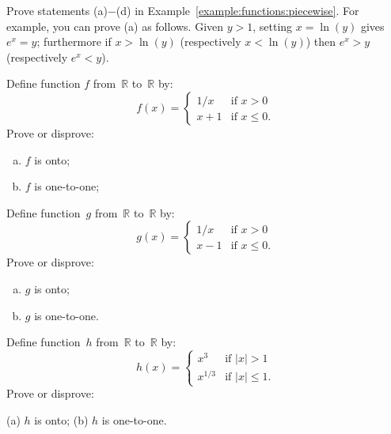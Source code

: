 \begin{exercise}{}
Prove statements (a)$-$(d) in Example~\ref{example:functions:piecewise}.  For example, you can prove (a)  as follows. Given $y>1$, setting $x = \ln(y)$ gives $e^x = y$; furthermore if $x > \ln(y)$ (respectively  $x < \ln(y)$) then $e^x > y$ (respectively $e^x < y$).
\end{exercise}



\begin{exercise}{} \label{OntoCasesExer}
 Define function $f$  from~$\mathbb{R}$ to~$\mathbb{R}$ by:
$$ f(x) = 
\begin{cases}
1/x & \mbox{if $x > 0$} \\
x + 1 & \mbox{if $x \le 0$.}
\end{cases} $$
Prove or disprove:
\begin{multicols}{2}
 \begin{enumerate}[(a)]
 \item \label{OntoCasesExer-fOnto}
 $f$ is onto;
 \item \label{OntoCasesExer-fNot11}
 $f$ is one-to-one;
\end{enumerate}
\end{multicols}
\end{exercise}

\begin{exercise}{} \label{OntoCasesExer2}
 Define function~$g$ from~$\mathbb{R}$ to~$\mathbb{R}$ by:
$$ g(x) = 
\begin{cases}
1/x & \mbox{if $x > 0$} \\
x - 1 & \mbox{if $x \le 0$}
 . \end{cases} $$
Prove or disprove:
\begin{multicols}{2}
 \begin{enumerate}[(a)]
 \item \label{OntoCasesExer-gNotOnto}
 $g$ is onto;
 \item \label{OntoCasesExer-g11} 
 $g$ is one-to-one.
\end{enumerate}
\end{multicols}
\end{exercise}

\begin{exercise}{} \label{OntoCasesExer2}
 Define function~$h$ from~$\mathbb{R}$ to~$\mathbb{R}$ by:
$$ h(x) = 
\begin{cases}
x^{3} & \mbox{if $|x| > 1$} \\
x^{1/3} & \mbox{if $|x| \le 1$}
 . \end{cases} $$
Prove or disprove:

(a) \qquad  $h$ is onto; \qquad \qquad (b)  $h$ is one-to-one.
\end{exercise}



